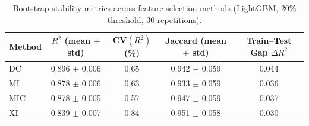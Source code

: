 \begin{table}[htbp]
\centering
\caption{Bootstrap stability metrics across feature-selection methods (LightGBM, 20\% threshold, 30 repetitions).}
\label{tab:stability_results}
\begin{tabular}{lcccc}
\toprule
Method & $R^2$ (mean $\pm$ std) & CV$(R^2)$ (\%) & Jaccard (mean $\pm$ std) & Train--Test Gap $\Delta R^2$ \\
\midrule
DC & 0.896 $\pm$ 0.006 & 0.65 & 0.942 $\pm$ 0.059 & 0.044 \\
MI & 0.878 $\pm$ 0.006 & 0.63 & 0.933 $\pm$ 0.059 & 0.036 \\
MIC & 0.878 $\pm$ 0.005 & 0.57 & 0.947 $\pm$ 0.059 & 0.037 \\
XI & 0.839 $\pm$ 0.007 & 0.84 & 0.951 $\pm$ 0.058 & 0.030 \\
\bottomrule
\end{tabular}
\end{table}